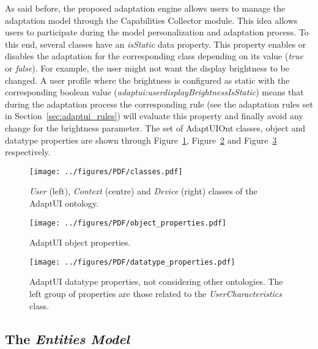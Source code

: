 As said before, the proposed adaptation engine allows users to manage the 
adaptation model through the Capabilities Collector module. This idea allows users to participate 
during the model personalization and adaptation process. To this end, several 
classes have an \textit{isStatic} data property. This property enables or 
disables the adaptation for the corresponding class depending on its value 
(\textit{true} or \textit{false}). For example, the user might not want the
display brightness to be changed. A user profile where the brightness is configured
as static with the corresponding boolean value (\textit{adaptui:userdisplayBrightnessIsStatic})
means that during the adaptation process the corresponding rule (see the adaptation
rules set in Section~\ref{sec:adaptui_rules}) will evaluate this property
and finally avoid any change for the brightness parameter. The set of AdaptUIOnt
classes, object and datatype properties are shown through Figure~\ref{fig:classes},
Figure~\ref{fig:object_properties} and Figure~\ref{fig:datatype_properties}
respectively.

\begin{figure}
\centering
\texttt{[image: ../figures/PDF/classes.pdf]}
\caption{\textit{User} (left), \textit{Context} (centre)
and \textit{Device} (right) classes of the AdaptUI ontology.}
\label{fig:classes}
\end{figure}

\begin{figure}
\centering
\texttt{[image: ../figures/PDF/object\_properties.pdf]}
\caption{AdaptUI object properties.}
\label{fig:object_properties}
\end{figure}

\begin{figure}
\centering
\texttt{[image: ../figures/PDF/datatype\_properties.pdf]}
\caption{AdaptUI datatype properties, not considering other ontologies. The left
group of properties are those related to
the \textit{UserCharacteristics} class.}
\label{fig:datatype_properties}
\end{figure}


\subsection{The \textit{Entities Model}}
\label{sec:entities_model}

